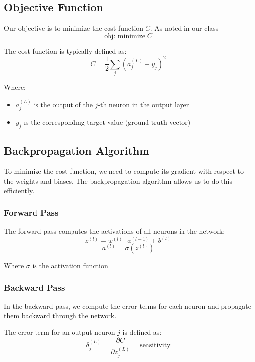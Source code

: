 \subsection{Objective Function}
Our objective is to minimize the cost function $C$. As noted in our class:
\begin{equation}
\text{obj: minimize } C
\end{equation}

The cost function is typically defined as:
\begin{equation}
C = \frac{1}{2}\sum_j (a_j^{(L)} - y_j)^2
\end{equation}

Where:
\begin{itemize}
    \item $a_j^{(L)}$ is the output of the $j$-th neuron in the output layer
    \item $y_j$ is the corresponding target value (ground truth vector)
\end{itemize}

\subsection{Backpropagation Algorithm}
To minimize the cost function, we need to compute its gradient with respect to the weights and biases. The backpropagation algorithm allows us to do this efficiently.

\subsubsection{Forward Pass}
The forward pass computes the activations of all neurons in the network:
\begin{equation}
z^{(l)} = w^{(l)} \cdot a^{(l-1)} + b^{(l)}
\end{equation}
\begin{equation}
a^{(l)} = \sigma(z^{(l)})
\end{equation}

Where $\sigma$ is the activation function.

\subsubsection{Backward Pass}
In the backward pass, we compute the error terms for each neuron and propagate them backward through the network.

The error term for an output neuron $j$ is defined as:
\begin{equation}
\delta_j^{(L)} = \frac{\partial C}{\partial z_j^{(L)}} = \text{sensitivity}
\end{equation}

